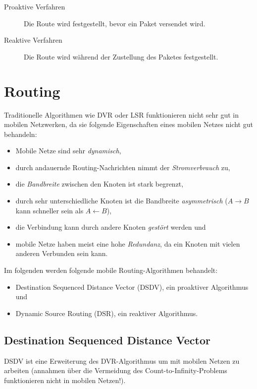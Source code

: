 	\begin{description}
		\item[Proaktive Verfahren] Die Route wird festgestellt, bevor ein Paket versendet wird.
		\item[Reaktive Verfahren] Die Route wird während der Zustellung des Paketes festgestellt.
	\end{description}

	\section{Routing}
		Traditionelle Algorithmen wie DVR oder LSR funktionieren nicht sehr gut in mobilen Netzwerken, da sie folgende Eigenschaften eines mobilen Netzes nicht gut behandeln:
		\begin{itemize}
			\item Mobile Netze sind sehr \textit{dynamisch},
			\item durch andauernde Routing-Nachrichten nimmt der \textit{Stromverbrauch} zu,
			\item die \textit{Bandbreite} zwischen den Knoten ist stark begrenzt,
			\item durch sehr unterschiedliche Knoten ist die Bandbreite \textit{asymmetrisch} ($ A \rightarrow B $ kann schneller sein als $ A \leftarrow B $),
			\item die Verbindung kann durch andere Knoten \textit{gestört} werden und
			\item mobile Netze haben meist eine hohe \textit{Redundanz}, da ein Knoten mit vielen anderen Verbunden sein kann.
		\end{itemize}

		Im folgenden werden folgende mobile Routing-Algorithmen behandelt:
		\begin{itemize}
			\item Destination Sequenced Distance Vector (DSDV), ein proaktiver Algorithmus und
			\item Dynamic Source Routing (DSR), ein reaktiver Algorithmus.
		\end{itemize}

		\subsection{Destination Sequenced Distance Vector}
			DSDV ist eine Erweiterung des DVR-Algorithmus um mit mobilen Netzen zu arbeiten (annahmen über die Vermeidung des Count-to-Infinity-Problems funktionieren nicht in mobilen Netzen!).

